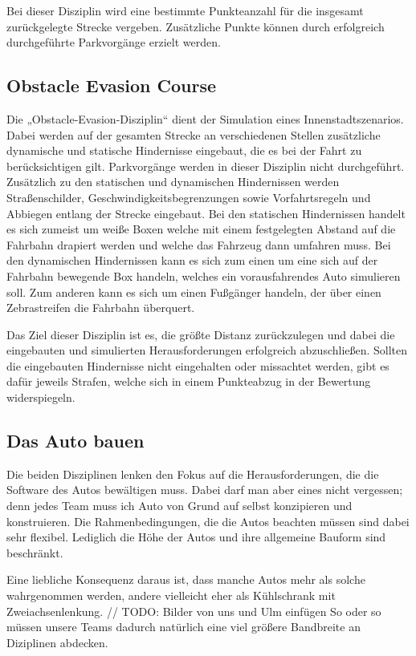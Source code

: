 Bei dieser Disziplin wird eine bestimmte Punkteanzahl für die insgesamt zurückgelegte Strecke vergeben. Zusätzliche
Punkte können durch erfolgreich durchgeführte Parkvorgänge erzielt werden.  

\subsection{Obstacle Evasion Course}
Die „Obstacle-Evasion-Disziplin“ dient der Simulation eines Innenstadtszenarios. Dabei werden auf der gesamten
Strecke an verschiedenen Stellen zusätzliche dynamische und statische Hindernisse eingebaut, die es bei der
Fahrt zu berücksichtigen gilt. Parkvorgänge werden in dieser Disziplin nicht durchgeführt. Zusätzlich zu den
statischen und dynamischen Hindernissen werden Straßenschilder, Geschwindigkeitsbegrenzungen sowie Vorfahrtsregeln
und Abbiegen entlang der Strecke eingebaut. Bei den statischen Hindernissen handelt es sich zumeist um weiße
Boxen welche mit einem festgelegten Abstand auf die Fahrbahn drapiert werden und welche das Fahrzeug dann umfahren
muss. Bei den dynamischen Hindernissen kann es sich zum einen um eine sich auf der Fahrbahn bewegende Box handeln,
welches ein vorausfahrendes Auto simulieren soll. Zum anderen kann es sich um einen Fußgänger handeln, der über
einen Zebrastreifen die Fahrbahn überquert.

Das Ziel dieser Disziplin ist es, die größte Distanz zurückzulegen und dabei die eingebauten und simulierten
Herausforderungen erfolgreich abzuschließen. Sollten die eingebauten Hindernisse nicht eingehalten oder missachtet
werden, gibt es dafür jeweils Strafen, welche sich in einem Punkteabzug in der Bewertung widerspiegeln.


\subsection{Das Auto bauen}
Die beiden Disziplinen lenken den Fokus auf die Herausforderungen, die die Software des Autos bewältigen muss.
Dabei darf man aber eines nicht vergessen; denn jedes Team muss ich Auto von Grund auf selbst konzipieren und konstruieren.
Die Rahmenbedingungen, die die Autos beachten müssen sind dabei sehr flexibel. 
Lediglich die Höhe der Autos und ihre allgemeine Bauform sind beschränkt.

Eine liebliche Konsequenz daraus ist, dass manche Autos mehr als solche wahrgenommen werden,
andere vielleicht eher als Kühlschrank mit Zweiachsenlenkung.
// TODO: Bilder von uns und Ulm einfügen
So oder so müssen unsere Teams dadurch natürlich eine viel größere Bandbreite an Diziplinen abdecken.

